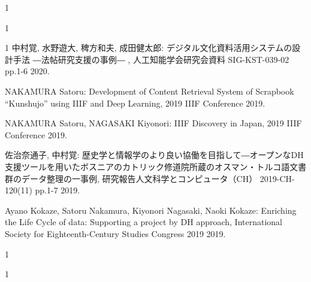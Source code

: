 \begin{公開}{1}
\end{公開}

\begin{特許}{1}

\end{特許}

\begin{発表}{1}
中村覚, 水野遊大, 稗方和夫, 成田健太郎:
 デジタル文化資料活用システムの設計手法 ―法帖研究支援の事例― ,  人工知能学会研究会資料 SIG-KST-039-02 pp.1-6 2020.

NAKAMURA Satoru:
 Development of Content Retrieval System of Scrapbook “Kunshujo” using IIIF and Deep Learning,  2019 IIIF Conference 2019.

NAKAMURA Satoru, NAGASAKI Kiyonori:
 IIIF Discovery in Japan,  2019 IIIF Conference 2019.

佐治奈通子, 中村覚:
 歴史学と情報学のより良い協働を目指して―オープンなDH支援ツールを用いたボスニアのカトリック修道院所蔵のオスマン・トルコ語文書群のデータ整理の一事例,  研究報告人文科学とコンピュータ（CH） 2019-CH-120(11) pp.1-7 2019.

Ayano Kokaze, Satoru Nakamura, Kiyonori Nagasaki, Naoki Kokaze:
 Enriching the Life Cycle of data: Supporting a project by DH approach,  International Society for Eighteenth-Century Studies Congress 2019 2019.

\end{発表}

\begin{特記}{1}
\end{特記}

\begin{報道}{1}

\end{報道}
